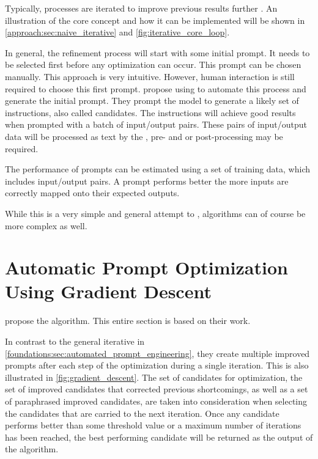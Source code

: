 Typically, \APE processes are iterated to improve previous results further \citeiterative. An illustration of the core concept and how it can be implemented will be shown in \autoref{approach:sec:naive_iterative} and  \autoref{fig:iterative_core_loop}.

In general, the refinement process will start with some initial prompt. It needs to be selected first before any optimization can occur. This prompt can be chosen manually. This approach is very intuitive. However, human interaction is still required to choose this first prompt. 
 propose using \LLMs to automate this process and generate the initial prompt. They prompt the model to generate a likely set of instructions, also called candidates. The instructions will achieve good results when prompted with a batch of input/output pairs. These pairs of input/output data will be processed as text by the \LLM, pre- and or post-processing may be required.

The performance of prompts can be estimated using a set of training data, which includes input/output pairs. A prompt performs better the more inputs are correctly mapped onto their expected outputs.

While this is a very simple and general attempt to \APE, algorithms can of course be more complex as well.


\section{Automatic Prompt Optimization Using Gradient Descent}
\label{sec:gradient_descent}
 propose the \ProTeGi algorithm. This entire section is based on their work.

In contrast to the general iterative \APE in \autoref{foundations:sec:automated_prompt_engineering}, they create multiple improved prompts after each step of the optimization during a single iteration. This is also illustrated in \autoref{fig:gradient_descent}. The set of candidates for optimization, the set of improved candidates that corrected previous shortcomings, as well as a set of paraphrased improved candidates, are taken into consideration when selecting the candidates that are carried to the next iteration. 
Once any candidate performs better than some threshold value or a maximum number of iterations has been reached, the best performing candidate will be returned as the output of the \ProTeGi algorithm.

